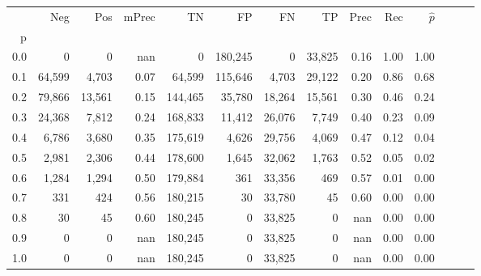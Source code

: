 \begin{tabular}{rrrrrrrrrrrrrr}
\toprule
{} &     Neg &     Pos & mPrec &       TN &       FP &      FN &      TP &  Prec &   Rec & $\hat{p}$ \\
p   &         &         &       &          &          &         &         &       &       &           \\
\midrule
0.0 &       0 &       0 &   nan &        0 &  180,245 &       0 &  33,825 &  0.16 &  1.00 &      1.00 \\
0.1 &  64,599 &   4,703 &  0.07 &   64,599 &  115,646 &   4,703 &  29,122 &  0.20 &  0.86 &      0.68 \\
0.2 &  79,866 &  13,561 &  0.15 &  144,465 &   35,780 &  18,264 &  15,561 &  0.30 &  0.46 &      0.24 \\
0.3 &  24,368 &   7,812 &  0.24 &  168,833 &   11,412 &  26,076 &   7,749 &  0.40 &  0.23 &      0.09 \\
0.4 &   6,786 &   3,680 &  0.35 &  175,619 &    4,626 &  29,756 &   4,069 &  0.47 &  0.12 &      0.04 \\
0.5 &   2,981 &   2,306 &  0.44 &  178,600 &    1,645 &  32,062 &   1,763 &  0.52 &  0.05 &      0.02 \\
0.6 &   1,284 &   1,294 &  0.50 &  179,884 &      361 &  33,356 &     469 &  0.57 &  0.01 &      0.00 \\
0.7 &     331 &     424 &  0.56 &  180,215 &       30 &  33,780 &      45 &  0.60 &  0.00 &      0.00 \\
0.8 &      30 &      45 &  0.60 &  180,245 &        0 &  33,825 &       0 &   nan &  0.00 &      0.00 \\
0.9 &       0 &       0 &   nan &  180,245 &        0 &  33,825 &       0 &   nan &  0.00 &      0.00 \\
1.0 &       0 &       0 &   nan &  180,245 &        0 &  33,825 &       0 &   nan &  0.00 &      0.00 \\
\bottomrule
\end{tabular}
